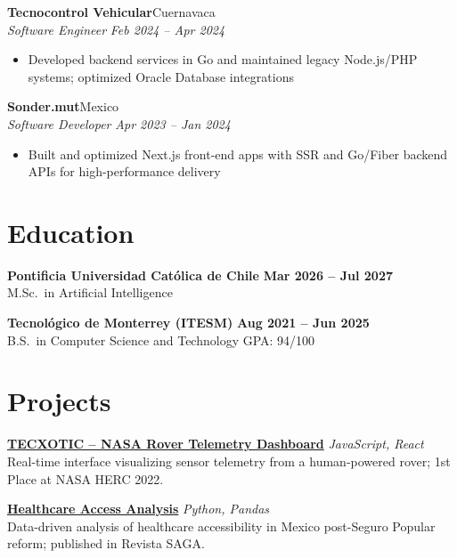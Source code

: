 \documentclass[10pt,a4paper]{article}
\begin{document}
\vspace{1pt}
\textbf{Tecnocontrol Vehicular}\hfill Cuernavaca\\[1pt]
\textit{Software Engineer} \hfill \textit{Feb 2024 -- Apr 2024}
\begin{itemize}
    \item Developed backend services in Go and maintained legacy Node.js/PHP systems; optimized Oracle Database integrations
\end{itemize}

\vspace{1pt}
\textbf{Sonder.mut}\hfill Mexico\\[1pt]
\textit{Software Developer} \hfill \textit{Apr 2023 -- Jan 2024}
\begin{itemize}
    \item Built and optimized Next.js front-end apps with SSR and Go/Fiber backend APIs for high-performance delivery
\end{itemize}

\section*{Education}

\textbf{Pontificia Universidad Cat\'{o}lica de Chile} \hfill \textbf{Mar 2026 -- Jul 2027}\\
M.Sc.\ in Artificial Intelligence

\textbf{Tecnol\'{o}gico de Monterrey (ITESM)} \hfill \textbf{Aug 2021 -- Jun 2025}\\
B.S.\ in Computer Science and Technology \hfill GPA: 94/100

\section*{Projects}

\textbf{\href{https://github.com/ArmandoArV/TECXOTIC-FRONT2023}{TECXOTIC -- NASA Rover Telemetry Dashboard}} \hfill \textit{JavaScript, React}\\
Real-time interface visualizing sensor telemetry from a human-powered rover; 1st Place at NASA HERC 2022.

\vspace{1pt}
\textbf{\href{https://github.com/ArmandoArV/IntroDataScienceProyecto}{Healthcare Access Analysis}} \hfill \textit{Python, Pandas}\\
Data-driven analysis of healthcare accessibility in Mexico post-Seguro Popular reform; published in Revista SAGA.
\end{document}
